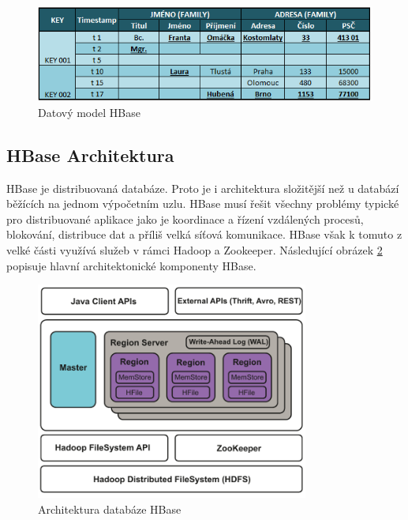 \documentclass[thesis=M,czech]{FITthesis}[2012/06/26]
\begin{document}
\begin{figure}[h]\centering
	\includegraphics[width=1\textwidth, angle=0]{files/hbase}
	\caption[Datový model HBase]{Datový model HBase}\label{fig:hbase}
\end{figure}

\subsection{HBase Architektura}
HBase je distribuovaná databáze. Proto je i architektura složitější než u databází běžících na jednom výpočetním uzlu. HBase musí řešit všechny problémy typické pro distribuované aplikace jako je koordinace a řízení vzdálených procesů, blokování, distribuce dat a příliš velká síťová komunikace. HBase však k tomuto z velké části využívá služeb v rámci Hadoop a Zookeeper. Následující obrázek \ref{fig:hbasearch} popisuje hlavní architektonické komponenty HBase.
\begin{figure}\centering
	\includegraphics[width=0.8\textwidth, angle=0]{files/hbase-architecture}
	\caption[Architektura databáze HBase]{Architektura databáze HBase}\label{fig:hbasearch}
\end{figure}
\end{document}
